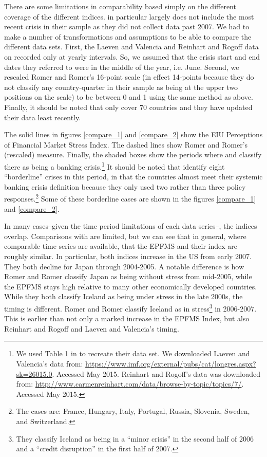 \documentclass[]{article}
\begin{document}
There are some limitations in comparability based simply on the
different coverage of the different indices. \cite{Romer2015}
in particular largely does not include the most recent crisis in their
sample as they did not collect data past 2007. We had to make a number
of transformations and assumptions to be able to compare the different
data sets. First, the Laeven and Valencia and Reinhart and Rogoff data
on recorded only at yearly intervals. So, we assumed that the crisis
start and end dates they referred to were in the middle of the year,
i.e. June. Second, we rescaled Romer and Romer's 16-point scale (in effect 14-points because they do not classify any country-quarter in
their sample as being at the upper two positions on the scale) to be
between 0 and 1 using the same method as above. Finally, it should be
noted that \cite{Reinhart2009} only cover 70 countries and they
have updated their data least recently.

The solid lines in figures \ref{compare_1} and \ref{compare_2} show the
EIU Perceptions of Financial Market Stress Index. The dashed lines show
Romer and Romer's (rescaled) measure. Finally, the shaded boxes show the
periods where \cite{laeven2013} and \cite{Reinhart2009} classify there as being a banking crisis.\footnote{We used Table 1 in \cite{Romer2015} to recreate their data set. We downloaded Laeven and Valencia's data from: \url{https://www.imf.org/external/pubs/cat/longres.aspx?sk=26015.0}.
  Accessed May 2015. Reinhart and Rogoff's data was downloaded from:
  \url{http://www.carmenreinhart.com/data/browse-by-topic/topics/7/}.
  Accessed May 2015.} It should be noted that \cite{laeven2013} identify eight ``borderline'' crises in this period, in that the countries almost meet their systemic banking crisis definition because they only used two rather than three policy responses.\footnote{The cases are: France, Hungary, Italy, Portugal, Russia, Slovenia, Sweden, and Switzerland.} Some of these borderline cases are shown in the figures \ref{compare_1} and \ref{compare_2}.

In many cases--given the time period limitations of each data series--,
the indices overlap. Comparisons with \cite{Romer2015} are limited, but we can see that in general, where comparable time series are available, that the EPFMS and their index are roughly similar. In particular, both indices increase in the US from early 2007. They both decline for Japan through 2004-2005. A notable difference is
how Romer and Romer classify Japan as being without stress from
mid-2005, while the EPFMS stays high relative to many other economically
developed countries. While they both classify Iceland as being under
stress in the late 2000s, the timing is different. Romer and
Romer classify Iceland as in stress\footnote{They classify Iceland as
  being in a ``minor crisis'' in the second half of 2006 and a ``credit
  disruption'' in the first half of 2007.} in 2006-2007. This is earlier
than not only a marked increase in the EPFMS Index, but also Reinhart
and Rogoff and Laeven and Valencia's timing.
\end{document}
